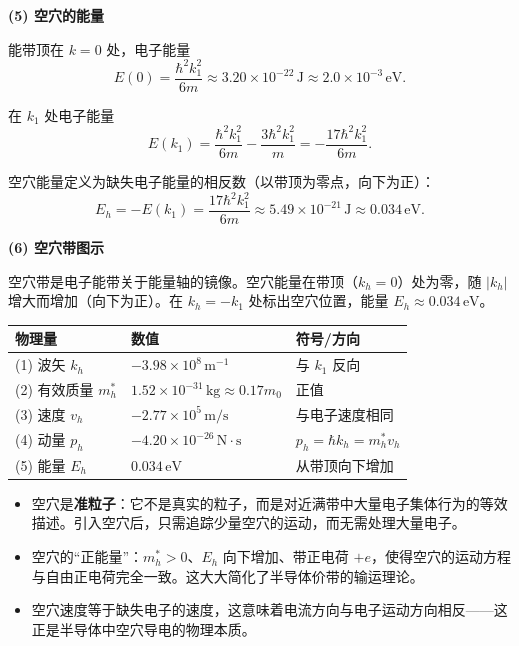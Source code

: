 \begin{derivationbox}[标准解题过程]
\textbf{(5) 空穴的能量}

能带顶在 $k=0$ 处，电子能量
\begin{equation}
E(0)=\frac{\hbar^2k_1^2}{6m}\approx3.20\times10^{-22}\,\text{J}\approx2.0\times10^{-3}\,\text{eV}.
\end{equation}

在 $k_1$ 处电子能量
\begin{equation}
E(k_1)=\frac{\hbar^2k_1^2}{6m}-\frac{3\hbar^2k_1^2}{m}=-\frac{17\hbar^2k_1^2}{6m}.
\end{equation}

空穴能量定义为缺失电子能量的相反数（以带顶为零点，向下为正）：
\begin{equation}
\boxed{E_h=-E(k_1)=\frac{17\hbar^2k_1^2}{6m}\approx5.49\times10^{-21}\,\text{J}\approx0.034\,\text{eV}.}
\end{equation}

\textbf{(6) 空穴带图示}

空穴带是电子能带关于能量轴的镜像。空穴能量在带顶（$k_h=0$）处为零，随 $|k_h|$ 增大而增加（向下为正）。在 $k_h=-k_1$ 处标出空穴位置，能量 $E_h\approx0.034\,\text{eV}$。
\end{derivationbox}

\begin{formulabox}[答案汇总]
\begin{center}
\begin{tabular}{lll}
\toprule
\textbf{物理量} & \textbf{数值} & \textbf{符号/方向} \\
\midrule
(1) 波矢 $k_h$ & $-3.98\times10^8\,\text{m}^{-1}$ & 与 $k_1$ 反向 \\
(2) 有效质量 $m_h^*$ & $1.52\times10^{-31}\,\text{kg}\approx0.17m_0$ & 正值 \\
(3) 速度 $v_h$ & $-2.77\times10^5\,\text{m/s}$ & 与电子速度相同 \\
(4) 动量 $p_h$ & $-4.20\times10^{-26}\,\text{N}\cdot\text{s}$ & $p_h=\hbar k_h=m_h^*v_h$ \\
(5) 能量 $E_h$ & $0.034\,\text{eV}$ & 从带顶向下增加 \\
\bottomrule
\end{tabular}
\end{center}
\end{formulabox}

\begin{insightbox}[物理图像]
\begin{itemize}
    \item 空穴是\textbf{准粒子}：它不是真实的粒子，而是对近满带中大量电子集体行为的等效描述。引入空穴后，只需追踪少量空穴的运动，而无需处理大量电子。
    \item 空穴的``正能量''：$m_h^*>0$、$E_h$ 向下增加、带正电荷 $+e$，使得空穴的运动方程与自由正电荷完全一致。这大大简化了半导体价带的输运理论。
    \item 空穴速度等于缺失电子的速度，这意味着电流方向与电子运动方向相反——这正是半导体中空穴导电的物理本质。
\end{itemize}
\end{insightbox}
